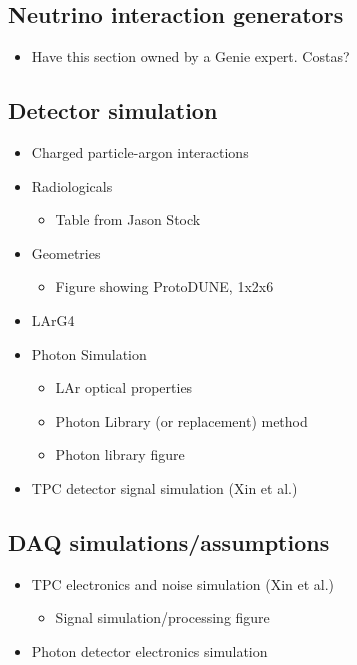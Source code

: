 \subsection{Neutrino interaction generators} 
\label{sec:tools-mc-gen}

\begin{itemize}
\item Have this section owned by a Genie expert. Costas?
\end{itemize}


\subsection{Detector simulation}
\label{sec:tools-mc-detsim}

\begin{itemize}
\item Charged particle-argon interactions
\item Radiologicals
\begin{itemize} \item Table from Jason Stock \end{itemize}
\item Geometries
\begin{itemize} \item Figure showing ProtoDUNE, 1x2x6 \end{itemize}
\item LArG4
\item Photon Simulation
\begin{itemize}
\item LAr optical properties
\item Photon Library (or replacement) method
\item Photon library figure
\end{itemize}
\item TPC detector signal simulation (Xin et al.)
\end{itemize}


\subsection{DAQ simulations/assumptions}
\label{sec:tools-mc-daq}

\begin{itemize}
\item TPC electronics and noise simulation (Xin et al.) 
\begin{itemize} \item Signal simulation/processing figure \end{itemize}
\item Photon detector electronics simulation
\end{itemize}


